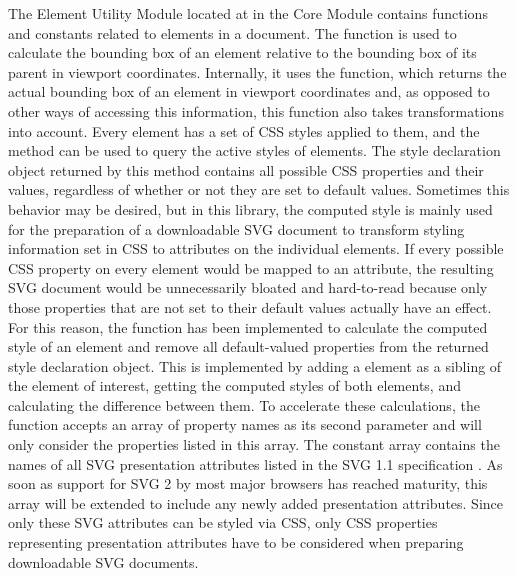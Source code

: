 The Element Utility Module located at  in
the Core Module contains functions and constants related to elements
in a document.  The  function is used to
calculate the bounding box of an element relative to the bounding box
of its parent in viewport coordinates.  Internally, it uses the
 function, which returns the actual
bounding box of an element in viewport coordinates and, as opposed to
other ways of accessing this information, this function also takes
transformations into account.  Every element has a set of CSS styles
applied to them, and the  method can be
used to query the active styles of elements.  The style declaration
object returned by this method contains all possible CSS properties
and their values, regardless of whether or not they are set to default
values.  Sometimes this behavior may be desired, but in this library,
the computed style is mainly used for the preparation of a
downloadable SVG document to transform styling information set in CSS
to attributes on the individual elements.  If every possible CSS
property on every element would be mapped to an attribute, the
resulting SVG document would be unnecessarily bloated and hard-to-read
because only those properties that are not set to their default values
actually have an effect.  For this reason, the
 function has been
implemented to calculate the computed style of an element and remove
all default-valued properties from the returned style declaration
object.  This is implemented by adding a  element
as a sibling of the element of interest, getting the computed styles
of both elements, and calculating the difference between them.  To
accelerate these calculations, the
 function accepts an array
of property names as its second parameter and will only consider the
properties listed in this array.  The constant
 array contains the names of all SVG
presentation attributes listed in the SVG 1.1 specification
\parencite{SVG11}.  As soon as support for SVG 2 \parencite{SVG2} by
most major browsers has reached maturity, this array will be extended
to include any newly added presentation attributes.  Since only these
SVG attributes can be styled via CSS, only CSS properties representing
presentation attributes have to be considered when preparing
downloadable SVG documents.

